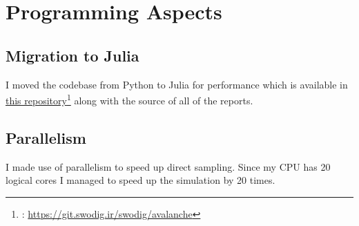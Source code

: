 \documentclass{article}
\begin{document}
\section{Programming Aspects}
\label{sec:org7acb515}

\subsection{Migration to Julia}
\label{sec:org57c4b7d}
I moved the codebase from Python to Julia for performance which is
available in \href{https://git.swodig.ir/swodig/avalanche}{this repository}\footnote{: \url{https://git.swodig.ir/swodig/avalanche}} along with the source of all of the reports.
\subsection{Parallelism}
\label{sec:org557695b}
I made use of parallelism to speed up direct sampling. Since my CPU
has 20 logical cores I managed to speed up the simulation by 20 times.
\end{document}
